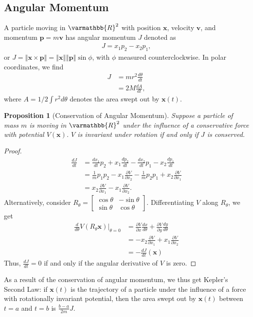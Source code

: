 \documentclass[12pt]{extarticle}
\newcommand{\R}{\varmathbb{R}}
\newcommand{\norm}[1]{\left\Vert #1\right\Vert}
\theoremstyle{plain}
\newtheorem*{proposition}{Proposition}%
\theoremstyle{definition}
\theoremstyle{remark}
\renewcommand{\newline}{\hfill\break}
\begin{document}
  \subsection{Angular Momentum}%
  A particle moving in $\R^2$ with position $\mathbf{x}$, velocity $\mathbf{v}$, and momentum $\mathbf{p} = m\mathbf{v}$ has angular momentum $J$ denoted as
  \begin{align*}
    J = x_1p_2 - x_2p_1,
  \end{align*}
  or $J = \norm{\mathbf{x}\times \mathbf{p}} = \norm{\mathbf{x}}\norm{\mathbf{p}}\sin\phi$, with $\phi$ measured counterclockwise. In polar coordinates, we find
  \begin{align*}
    J &= mr^2\frac{d\theta}{dt}\\
      &= 2M\frac{dA}{dt},
  \end{align*}
  where $A= 1/2 \int r^2 d\theta$ denotes the area swept out by $\mathbf{x}(t)$.
  \begin{proposition}[Conservation of Angular Momentum]
    Suppose a particle of mass $m$ is moving in $\R^2$ under the influence of a conservative force with potential $V(\mathbf{x})$. $V$ is invariant under rotation if and only if $J$ is conserved.
  \end{proposition}
  \begin{proof}
    \begin{align*}
      \frac{dJ}{dt} &= \frac{dx_1}{dt}p_2 + x_1\frac{dp_2}{dt} - \frac{dx_2}{dt}p_1 - x_2\frac{dp_1}{dt}\\
                    &= \frac{1}{m}p_1p_2 - x_1\frac{\partial V}{\partial x_2} - \frac{1}{m}p_2p_1 + x_2\frac{\partial V}{\partial x_1}\\
                    &= x_2\frac{\partial V}{\partial x_1} - x_1\frac{\partial V}{\partial x_2}.
    \end{align*}
    Alternatively, consider $R_{\theta} = \begin{bmatrix}\cos\theta & -\sin\theta \\ \sin\theta & \cos\theta\end{bmatrix}$. Differentiating $V$ along $R_{\theta}$, we get
    \begin{align*}
      \frac{d}{d\theta}V(R_{\theta}\mathbf{x})\biggr\vert_{\theta = 0} &= \frac{\partial V}{\partial x}\frac{dx}{d\theta} + \frac{\partial V}{\partial y}\frac{dy}{d\theta}\\
                                                                       &= -x_2\frac{\partial V}{\partial x_1} + x_1\frac{\partial V}{\partial x_2}\\
                                                                       &= -\frac{dJ}{dt}\left(\mathbf{x}\right)
    \end{align*}
    Thus, $\frac{dJ}{dt} = 0$ if and only if the angular derivative of $V$ is zero.
  \end{proof}
  As a result of the conservation of angular momentum, we thus get Kepler's Second Law: if $\mathbf{x}(t)$ is the trajectory of a particle under the influence of a force with rotationally invariant potential, then the area swept out by $\mathbf{x}(t)$ between $t=a$ and $t=b$ is $\frac{b-a}{2m}J$.\newline
\end{document}
